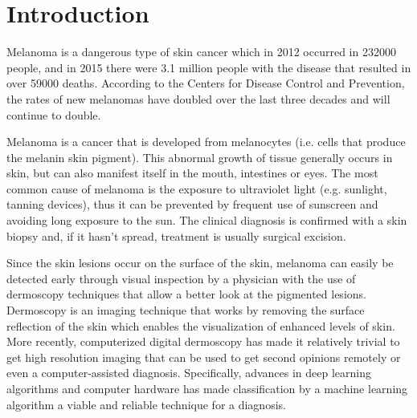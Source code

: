 \chapter{Introduction}
\label{chapter:introduction}

Melanoma is a dangerous type of skin cancer which in 2012 occurred in 232000 people, and in 2015 there were 3.1 million people with the disease that resulted in over 59000 deaths. According to the Centers for Disease Control and Prevention, the rates of new melanomas have doubled over the last three decades and will continue to double.

Melanoma is a cancer that is developed from melanocytes (i.e. cells that produce the melanin skin pigment). This abnormal growth of tissue generally occurs in skin, but can also manifest itself in the mouth, intestines or eyes. The most common cause of melanoma is the exposure to ultraviolet light (e.g. sunlight, tanning devices), thus it can be prevented by frequent use of sunscreen and avoiding long exposure to the sun. The clinical diagnosis is confirmed with a skin biopsy and, if it hasn't spread, treatment is usually surgical excision.

Since the skin lesions occur on the surface of the skin, melanoma can easily be detected early through visual inspection by a physician with the use of dermoscopy techniques that allow a better look at the pigmented lesions. Dermoscopy is an imaging technique that works by removing the surface reflection of the skin which enables the visualization of enhanced levels of skin. More recently, computerized digital dermoscopy has made it relatively trivial to get high resolution imaging that can be used to get second opinions remotely or even a computer-assisted diagnosis\cite{dermoscopy}. Specifically, advances in deep learning algorithms and computer hardware has made classification by a machine learning algorithm a viable and reliable technique for a diagnosis.
